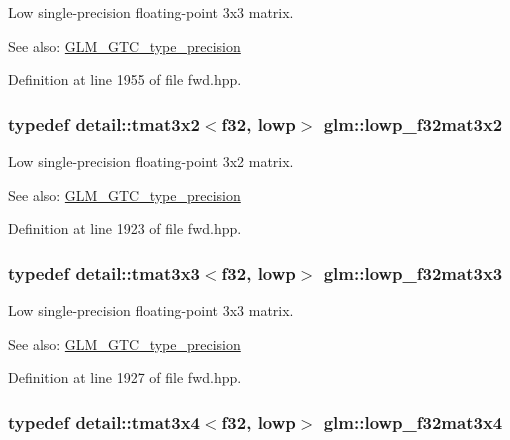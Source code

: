 Low single-precision floating-point 3x3 matrix. \begin{Desc}
\item[See also:]\hyperlink{group__gtc__type__precision}{GLM\_\-GTC\_\-type\_\-precision} \end{Desc}


Definition at line 1955 of file fwd.hpp.\hypertarget{group__gtc__type__precision_gdf8ee4630e8d2b6ae72293a7c8dff497}{
\subsubsection[lowp\_\-f32mat3x2]{\setlength{\rightskip}{0pt plus 5cm}typedef detail::tmat3x2$<$f32, lowp$>$ {\bf glm::lowp\_\-f32mat3x2}}}
\label{group__gtc__type__precision_gdf8ee4630e8d2b6ae72293a7c8dff497}


Low single-precision floating-point 3x2 matrix. \begin{Desc}
\item[See also:]\hyperlink{group__gtc__type__precision}{GLM\_\-GTC\_\-type\_\-precision} \end{Desc}


Definition at line 1923 of file fwd.hpp.\hypertarget{group__gtc__type__precision_g92f4b130a9651c69361600272f113542}{
\subsubsection[lowp\_\-f32mat3x3]{\setlength{\rightskip}{0pt plus 5cm}typedef detail::tmat3x3$<$f32, lowp$>$ {\bf glm::lowp\_\-f32mat3x3}}}
\label{group__gtc__type__precision_g92f4b130a9651c69361600272f113542}


Low single-precision floating-point 3x3 matrix. \begin{Desc}
\item[See also:]\hyperlink{group__gtc__type__precision}{GLM\_\-GTC\_\-type\_\-precision} \end{Desc}


Definition at line 1927 of file fwd.hpp.\hypertarget{group__gtc__type__precision_g7f81032f05c8a1b96b33c328f38c72d3}{
\subsubsection[lowp\_\-f32mat3x4]{\setlength{\rightskip}{0pt plus 5cm}typedef detail::tmat3x4$<$f32, lowp$>$ {\bf glm::lowp\_\-f32mat3x4}}}
\label{group__gtc__type__precision_g7f81032f05c8a1b96b33c328f38c72d3}


